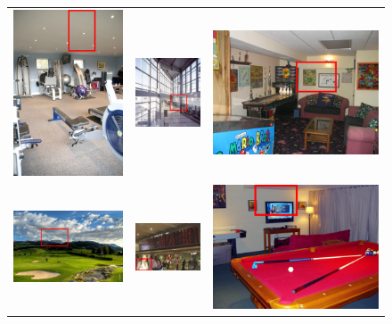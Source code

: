 \documentclass[runningheads,a4paper]{llncs}
\begin{document}
%


\begin{figure}
\begin{center}
\begin{tabular}{ccc}
  \includegraphics[height=0.20\linewidth]{article2/images/cloud1.png}&
  \includegraphics[height=0.20\linewidth]{article2/images/man1.png} &
  \includegraphics[height=0.20\linewidth]{article2/images/tele1.png}\\ 
  \includegraphics[height=0.20\linewidth]{article2/images/cloud2.png}&
  \includegraphics[height=0.20\linewidth]{article2/images/man2.png} &
  \includegraphics[height=0.20\linewidth]{article2/images/tele2.png}\\ 
\end{tabular}
\end{center}


\end{figure}
\end{document}
